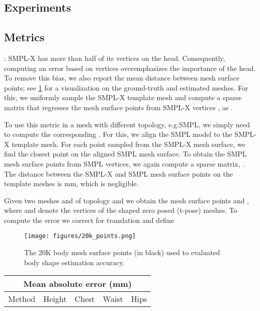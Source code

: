 \documentclass[10pt,twocolumn,letterpaper]{article}
\newcommand{\qheading}[1]{\noindent\textbf{#1}:}
\newcommand{\smplx}{\mbox{SMPL-X}\xspace}
\newcommand{\groundtruth}{\mbox{ground-truth}\xspace}
\newcommand{\smpl}{\mbox{SMPL}\xspace}
\renewcommand{\eg}{\mbox{e.g.}\xspace}
\newcommand{\vtovHD}{\mbox{}\xspace}
\newcommand{\myarraystretch}[0]{1.1}
\begin{document}
\begin{appendices}
\section{Experiments}

\subsection{Metrics} \label{supmat:sec:metrics}

\qheading{\vtovHD}
\smplx has more than half of its vertices on the head.
Consequently, computing an error based on vertices
overemphasizes
the importance of the head.
To remove this bias, we also report the mean distance between  mesh surface points; see \cref{fig:mesh_surface_points} for a visualization on the \groundtruth and estimated meshes.
For this, we uniformly sample the \smplx template mesh and
compute a sparse matrix 
that regresses the mesh surface points from \smplx vertices ,
as .

To use this metric in a mesh with different topology, \eg \smpl,
we simply need to compute the corresponding .
For this, we align the \smpl model to the \smplx template mesh.
For each point sampled from the \smplx mesh surface,
we find the closest point on the aligned \smpl mesh surface.
To obtain the \smpl mesh surface points from \smpl vertices,
we again compute a sparse matrix, .
The distance between the \smplx and \smpl mesh surface points on the template meshes is  mm,
which is negligible.

Given two meshes  and  of topology  and  we obtain the mesh surface points  and , where  and  denote the vertices of the shaped zero posed (t-pose) meshes.
To compute the \vtovHD error we correct for translation  and define 


 \begin{figure}[t!]
    \centering \texttt{[image: figures/20k\_points.png]}
    \caption{The 20K body mesh surface points (in black) used to evaluated body shape
        estimation accuracy.}
    \label{fig:mesh_surface_points}
\end{figure} 

\begin{table}[t!]
    \renewcommand{\arraystretch}{\myarraystretch}
    \centering
    \scriptsize
    \begin{tabular}{lllll}
        \toprule
        \multicolumn{5}{c}{Mean absolute error (mm) }                                     \\
        \midrule   Method                                & Height      & Chest       & Waist       & Hips        \\


\end{tabular}
\end{table}
\end{appendices}
\end{document}
